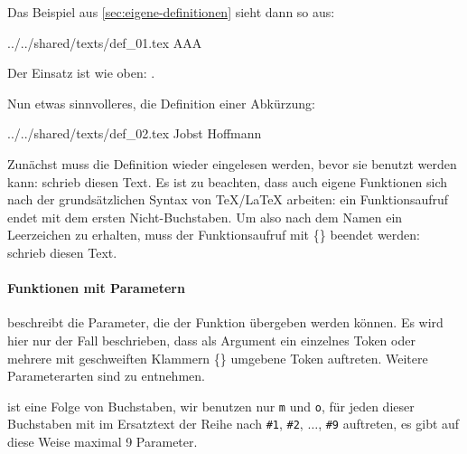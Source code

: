 \documentclass[ngerman,               %
               a4paper,               %
               fleqn,                 %
                     ]{scrartcl}       %
\begin{document}
Das Beispiel aus \cref{sec:eigene-definitionen} sieht dann so aus:
\begin{verbatimwrite}{../../shared/texts/def_01.tex}
\NewDocumentCommand{\iiiA}        %
                   {}             %
                   {AAA}          %
\end{verbatimwrite}


Der Einsatz ist wie oben: \iiiA.

Nun etwas sinnvolleres, die Definition einer Abkürzung:
\begin{verbatimwrite}{../../shared/texts/def_02.tex}
\NewDocumentCommand{\JHf}       %
                   {}           %
                   {Jobst Hoffmann}  %
\end{verbatimwrite}



Zunächst muss die Definition wieder eingelesen werden, bevor sie
benutzt werden kann: \JHf schrieb diesen Text. Es ist zu beachten,
dass auch eigene Funktionen sich nach der grundsätzlichen Syntax von
\TeX/\LaTeX{} arbeiten: ein Funktionsaufruf endet mit dem ersten
Nicht-Buchstaben. Um also nach dem Namen ein Leerzeichen zu erhalten,
muss der Funktionsaufruf mit \{\} beendet werden: \JHf{} schrieb
diesen Text.

\paragraph{Funktionen mit Parametern}

 beschreibt die Parameter, die der Funktion übergeben werden
können. Es wird hier nur der Fall beschrieben, dass als Argument ein
einzelnes Token oder mehrere mit geschweiften Klammern \{\} umgebene Token
auftreten. Weitere Parameterarten sind \cite{latex_project_22:xparse} zu
entnehmen.

 ist eine Folge von Buchstaben, wir benutzen nur \texttt{m} und
\texttt{o}, für jeden dieser Buchstaben mit im Ersatztext der Reihe nach
\lstinline|#1|, \lstinline|#2|, $\ldots$, \lstinline|#9| auftreten, es gibt
auf diese Weise maximal 9 Parameter.
\end{document}

